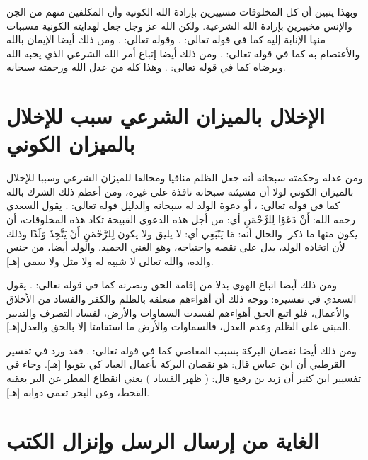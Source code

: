 وبهذا يتبين أن كل المخلوقات مسييرين بإرادة الله الكونية وأن المكلفين منهم من الجن والإنس مخييرين بإرادة الله الشرعية. ولكن الله عز وجل جعل لهدايته الكونية مسببات منها الإنابة إليه كما في قوله تعالى:
\quranayah*[42][13][30]{\footnotesize \surahname*[42]}. وقوله تعالى:
\quranayah*[13][27]{\footnotesize \surahname*[13]}.
ومن ذلك أيضا الإيمان بالله والأعتصام به كما في قوله تعالى:
\quranayah*[4][175]{\footnotesize \surahname*[4]}. ومن ذلك أيضا إتباع أمر الله الشرعي الذي يحبه الله ويرضاه كما في قوله تعالى:
\quranayah*[5][16]{\footnotesize \surahname*[5]}. وهذا كله من عدل الله ورحمته سبحانه.

\section{الإخلال بالميزان الشرعي سبب للإخلال بالميزان الكوني}

ومن عدله وحكمته سبحانه أنه جعل الظلم منافيا ومخالفا للميزان الشرعي وسببا للإخلال بالميزان الكوني لولا أن مشيئته سبحانه نافذة على غيره، ومن أعظم ذلك الشرك بالله كما في قوله تعالى:
\quranayah*[31][13]{\footnotesize \surahname*[31]}، أو دعوة الولد له سبحانه والدليل قوله تعالى:
\quranayah*[19][88-91]{\footnotesize \surahname*[19]}. يقول السعدي رحمه الله: { أَنْ دَعَوْا لِلرَّحْمَنِ } أي: من أجل هذه الدعوى القبيحة تكاد هذه المخلوقات، أن يكون منها ما ذكر. والحال أنه: { مَا يَنْبَغِي } أي: لا يليق ولا يكون { لِلرَّحْمَنِ أَنْ يَتَّخِذَ وَلَدًا } وذلك لأن اتخاذه الولد، يدل على نقصه واحتياجه، وهو الغني الحميد. والولد أيضا، من جنس والده، والله تعالى لا شبيه له ولا مثل ولا سمي [هـ].

ومن ذلك أيضا اتباع الهوى بدلا من إقامة الحق ونصرته كما في قوله تعالى:
\quranayah*[23][71]{\footnotesize \surahname*[23]}. يقول السعدي في تفسيره:
ووجه ذلك أن أهواءهم متعلقة بالظلم والكفر والفساد من الأخلاق والأعمال، فلو اتبع الحق أهواءهم لفسدت السماوات والأرض، لفساد التصرف والتدبير المبني على الظلم وعدم العدل، فالسماوات والأرض ما استقامتا إلا بالحق والعدل[هـ].

ومن ذلك أيضا نقصان البركة بسبب المعاصي كما في قوله تعالى:
\quranayah*[30][41]{\footnotesize \surahname*[30]}. فقد ورد في تفسير القرطبي أن ابن عباس قال: هو نقصان البركة بأعمال العباد كي يتوبوا [هـ]. وجاء في تفسيير ابن كثير أن زيد بن رفيع قال: ( ظهر الفساد ) يعني انقطاع المطر عن البر يعقبه القحط، وعن البحر تعمى دوابه [هـ].


\section{الغاية من إرسال الرسل وإنزال الكتب}

